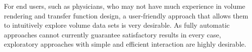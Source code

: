 For end users, such as physicians, who may not have much experience in volume rendering and transfer function design, 
a user-friendly approach that allows them to intuitively explore volume data sets is very desirable.
As fully automatic approaches cannot currently guarantee satisfactory results in every case, 
exploratory approaches with simple and efficient interaction are highly desirable.


